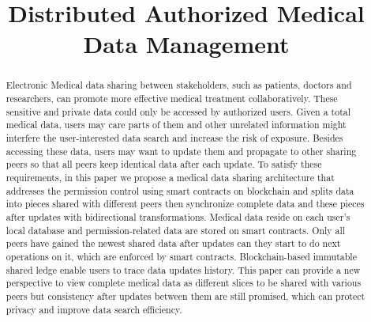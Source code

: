 \documentclass[conference]{IEEEtran}
\begin{document}
	

\title{Distributed Authorized Medical Data Management}


\author{
}

\maketitle

\begin{abstract}
	Electronic Medical data sharing between stakeholders, such as patients, doctors and researchers, can promote more effective medical treatment collaboratively. These sensitive and private data could only be accessed by authorized users.  Given a total medical data, users may care parts of them and other unrelated information might interfere the user-interested data search and increase the risk of exposure. Besides accessing these data, users may want to update them and propagate to other sharing peers so that all peers keep identical data after each update. To satisfy these requirements, in this paper we propose a medical data sharing architecture that addresses the permission control using smart contracts on blockchain and splits data into pieces shared with different peers then synchronize complete data and these pieces after updates with bidirectional transformations. Medical data reside on each user's local database and permission-related data are stored on smart contracts. Only all peers have gained the newest shared data after updates can they start to do next operations on it, which are enforced by smart contracts. Blockchain-based  immutable shared ledge enable users to trace data updates history. This paper can provide a new perspective to view complete medical data as different slices to be shared with various peers but consistency after updates between them are still promised, which can protect privacy and improve data search efficiency.

\end{abstract}
\end{document}
